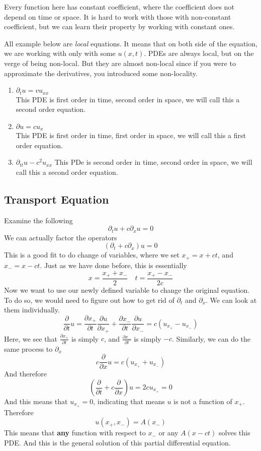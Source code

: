 \documentclass[12pt]{book}
\newcommand{\pypx}[2]{\frac{\partial #1}{\partial #2}}
\newcommand{\paren}[1]{\left( #1 \right)}
\begin{document}
Every function here has constant coefficient, where the coefficient does not depend on time or space. It is hard to work with those with non-constant coefficient, but we can learn their property by working with constant ones. 

All example below are \textit{local} equations. It means that on both side of the equation, we are working with only with some $u(x,t)$. PDEs are always local, but on the verge of being non-local. But they are almost non-local since if you were to approximate the derivatives, you introduced some non-locality.
\begin{enumerate}
    \item $\partial_t u = vu_{xx}$\\
    This PDE is first order in time, second order in space, we will call this a second order equation.
    \item $\partial u = cu_x$\\
    This PDE is first order in time, first order in space, we will call this a first order equation.
    \item $\partial_{tt}u - c^2u_{xx}$
    This PDe is second order in time, second order in space, we will call this a second order equation.
\end{enumerate}

\subsection{Transport Equation}
Examine the following
\[
\partial_t u + c\partial_x u = 0
\]
We can actually factor the operators
\[
\paren{\partial_t + c\partial_x} u = 0
\]
This is a good fit to do change of variables, where we set $x_+ = x+ct$, and $x_- = x-ct$. Just as we have done before, this is essentially
\[
x = \frac{x_++x_-}{2} \quad t = \frac{x_+-x_-}{2c}
\]
Now we want to use our newly defined variable to change the original equation. To do so, we would need to figure out how to get rid of $\partial_t$ and $\partial_x$. We can look at them individually. 
\[
\pypx{}{t} u = \pypx{x_+}{t}\pypx{u}{x_+} + \pypx{x_-}{t}\pypx{u}{x_-} = c\paren{u_{x_+} - u_{x_-}}
\]
Here, we see that $\pypx{x_+}{t}$ is simply $c$, and $\pypx{x_-}{t}$ is simply $-c$. Similarly, we can do the same process to $\partial_x$
\[
c \pypx{}{x}u = c\paren{u_{x_+} + u_{x_-}}
\]
And therefore
\[
\paren{\pypx{}{t}+c\pypx{}{x}}u = 2cu_{x_+} = 0
\]
And this means that $u_{x_+} = 0$, indicating that means $u$ is not a function of $x_+$. Therefore
\[
u(x_+,x_-) = A(x_-) 
\]
This means that \textbf{any} function with respect to $x_-$ or any $A(x-ct)$ solves this PDE.  And this is the general solution of this partial differential equation.
\end{document}
